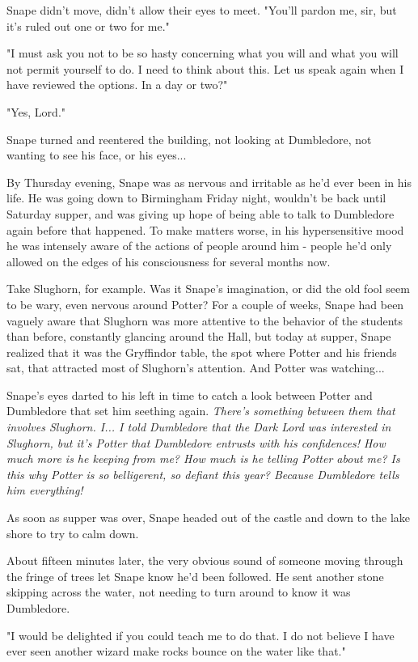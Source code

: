 \documentclass[a4paper,11pt]{article}
\begin{document}
Snape didn't move, didn't allow their eyes to meet. "You'll pardon me, sir, but it's ruled out one or two for me."

"I must ask you not to be so hasty concerning what you will and what you will not permit yourself to do. I need to think about this. Let us speak again when I have reviewed the options. In a day or two?"

"Yes, Lord."

Snape turned and reentered the building, not looking at Dumbledore, not wanting to see his face, or his eyes...

By Thursday evening, Snape was as nervous and irritable as he'd ever been in his life. He was going down to Birmingham Friday night, wouldn't be back until Saturday supper, and was giving up hope of being able to talk to Dumbledore again before that happened. To make matters worse, in his hypersensitive mood he was intensely aware of the actions of people around him - people he'd only allowed on the edges of his consciousness for several months now.

Take Slughorn, for example. Was it Snape's imagination, or did the old fool seem to be wary, even nervous around Potter? For a couple of weeks, Snape had been vaguely aware that Slughorn was more attentive to the behavior of the students than before, constantly glancing around the Hall, but today at supper, Snape realized that it was the Gryffindor table, the spot where Potter and his friends sat, that attracted most of Slughorn's attention. And Potter was watching...

Snape's eyes darted to his left in time to catch a look between Potter and Dumbledore that set him seething again. \emph{There's something between them that involves Slughorn. I... I told Dumbledore that the Dark Lord was interested in Slughorn, but it's Potter that Dumbledore entrusts with his confidences! How much more is he keeping from me? How much is he telling Potter about me? Is this why Potter is so belligerent, so defiant this year? Because Dumbledore tells him everything!}

As soon as supper was over, Snape headed out of the castle and down to the lake shore to try to calm down.

About fifteen minutes later, the very obvious sound of someone moving through the fringe of trees let Snape know he'd been followed. He sent another stone skipping across the water, not needing to turn around to know it was Dumbledore.

"I would be delighted if you could teach me to do that. I do not believe I have ever seen another wizard make rocks bounce on the water like that."
\end{document}
